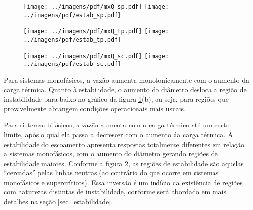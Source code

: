 \documentclass[a4paper,portuguese,10pt]{article}
\begin{document}
\begin{figure}
  \begin{center}
    \texttt{[image: ../imagens/pdf/mxQ\_sp.pdf]}
    \texttt{[image: ../imagens/pdf/estab\_sp.pdf]}
    \vspace*{-10mm}
    \label{fig_sist_monofasico}
  \end{center}
\end{figure}

\begin{figure}
  \begin{center}
    \texttt{[image: ../imagens/pdf/mxQ\_tp.pdf]}
    \texttt{[image: ../imagens/pdf/estab\_tp.pdf]}
    \vspace*{-10mm}
    \label{fig_sist_bifasico}
  \end{center}
\end{figure}

\begin{figure}
  \begin{center}
    \texttt{[image: ../imagens/pdf/mxQ\_sc.pdf]}
    \texttt{[image: ../imagens/pdf/estab\_sc.pdf]}
    \vspace*{-10mm}
    \label{fig_sist_supercritico}
  \end{center}
\end{figure}

Para sistemas monofásicos, a vazão aumenta monotonicamente com o aumento da carga térmica. Quanto à estabilidade, o aumento do diâmetro desloca a região de instabilidade para baixo no gráfico da figura \ref{fig_sist_monofasico}(b), ou seja, para regiões que provavelmente abrangem condições operacionais mais usuais.

Para sistemas bifásicos, a vazão aumenta com a carga térmica até um certo limite, após o qual ela passa a decrescer com o aumento da carga térmica. A estabilidade do escoamento apresenta respostas totalmente diferentes em relação a sistemas monofásicos, com o aumento do diâmetro gerando regiões de estabilidade maiores. Conforme a figura \ref{fig_sist_bifasico}, as regiões de estabilidade são aquelas ``cercadas'' pelas linhas neutras (ao contrário do que ocorre em sistemas monofásicos e supercríticos). Essa inversão é um indício da existência de regiões com naturezas distintas de instabilidade, conforme será abordado em mais detalhes na seção \ref{sec_estabilidade}.
\end{document}
